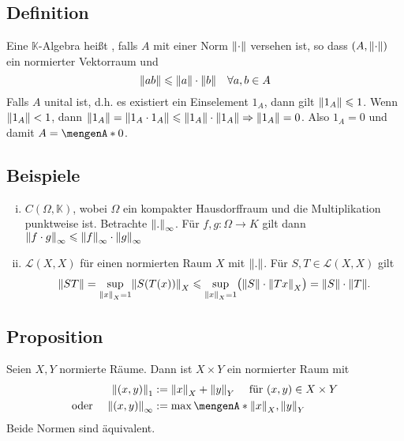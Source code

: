 \subsection[Definition: Normierte $\mathds{K}$-Algebra]{Definition} %
\label{sub:210}
Eine $\mathds{K}$-Algebra heißt , falls $A$ mit einer Norm $\norm{\cdot}$ versehen ist, so dass $(A,\norm{\cdot} )$ ein normierter Vektorraum und
\[
	\norm{a b} \le \norm{a} \cdot \norm{b} \quad \forall a,b \in A   
\]
Falls $A$ unital ist, d.h. es existiert ein Einselement $1_A$, dann gilt $\norm{1_A} \le 1$.
Wenn $\norm{1_A} < 1$, dann $\norm{1_A} = \norm{1_A \cdot 1_A} \le \norm{1_A} \cdot \norm{1_A} \Rightarrow \norm{1_A} =0 $. Also $1_A=0$ und damit $A= \set{0}$.

\subsection[Beispiele für normierte Algebren]{Beispiele} %
\label{sub:211}
\begin{enumerate}[(i)]
	\item $C(\Omega,\mathds{K})$, wobei $\Omega$ ein kompakter Hausdorffraum und die Multiplikation punktweise ist. Betrachte $\norm[\infty]{.}$. Für $f,g : \Omega \to K$ gilt dann
	$\norm[\infty]{f \cdot g} \le \norm[\infty]{f} \cdot \norm[\infty]{g}$
	\item $\mathcal{L}(X,X)$ für einen normierten Raum $X$ mit $\norm{.}$. Für $S,T \in \mathcal{L}(X,X)$ gilt
	\[
		\norm{S T} = \sup_{\norm[X]{x}=1} \norm[X]{S(T(x))} \le \sup_{\norm[X]{x}=1} \enbrace[\big]{\norm{S} \cdot \norm[X]{Tx}} = \norm{S} \cdot \norm{T}.     
	\]
\end{enumerate}

\subsection[Proposition: Norm auf dem Produkt normierter Räume]{Proposition} %
\label{sub:212}
Seien $X,Y$ normierte Räume. Dann ist $X \times Y$ ein normierter Raum mit 
\begin{align*}
	 \norm[1]{(x,y)} &:= \norm[X]{x} + \norm[Y]{y}   \quad \text{ für } (x,y) \in X \times Y \\
	\text{oder } \quad \norm[\infty]{(x,y)} &:= \max \set{\norm[X]{x}, \norm[Y]{y}}  
\end{align*}
Beide Normen sind äquivalent.

